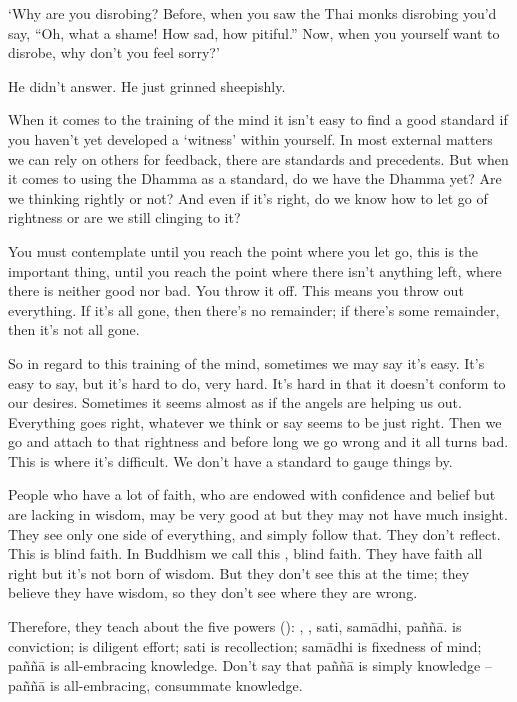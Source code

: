 `Why are you disrobing? Before, when you saw the Thai monks disrobing you'd say, ``Oh, what a shame! How sad, how pitiful.'' Now, when you yourself want to disrobe, why don't you feel sorry?' 

He didn't answer. He just grinned sheepishly. 

When it comes to the training of the mind it isn't easy to find a good standard if you haven't yet developed a `witness' within yourself. In most external matters we can rely on others for feedback, there are standards and precedents. But when it comes to using the Dhamma as a standard, do we have the Dhamma yet? Are we thinking rightly or not? And even if it's right, do we know how to let go of rightness or are we still clinging to it? 

You must contemplate until you reach the point where you let go, this is the important thing, until you reach the point where there isn't anything left, where there is neither good nor bad. You throw it off. This means you throw out everything. If it's all gone, then there's no remainder; if there's some remainder, then it's not all gone. 

So in regard to this training of the mind, sometimes we may say it's easy. It's easy to say, but it's hard to do, very hard. It's hard in that it doesn't conform to our desires. Sometimes it seems almost as if the angels are helping us out. Everything goes right, whatever we think or say seems to be just right. Then we go and attach to that rightness and before long we go wrong and it all turns bad. This is where it's difficult. We don't have a standard to gauge things by. 

People who have a lot of faith, who are endowed with confidence and belief but are lacking in wisdom, may be very good at  but they may not have much insight. They see only one side of everything, and simply follow that. They don't reflect. This is blind faith. In Buddhism we call this , blind faith. They have faith all right but it's not born of wisdom. But they don't see this at the time; they believe they have wisdom, so they don't see where they are wrong. 

Therefore, they teach about the five powers (): , , sati, sam\=adhi, pa\~n\~n\=a.  is conviction;  is diligent effort; sati is recollection; sam\=adhi is fixedness of mind; pa\~n\~n\=a is all-embracing knowledge. Don't say that pa\~n\~n\=a is simply knowledge -- pa\~n\~n\=a is all-embracing, consummate knowledge. 

